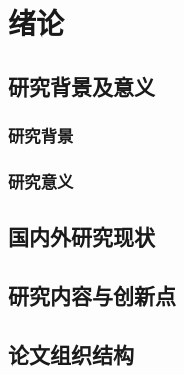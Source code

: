 \section{绪论}

\subsection{研究背景及意义}
\subsubsection{研究背景}

\subsubsection{研究意义}

\subsection{国内外研究现状}

\subsection{研究内容与创新点}


\subsection{论文组织结构}
